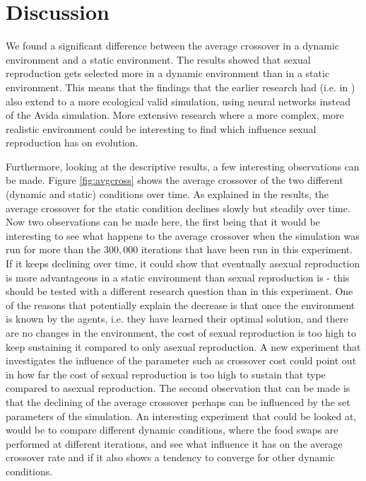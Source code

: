 \section{Discussion}

We found a significant difference between the average crossover in a dynamic environment and a static environment.
The results showed that sexual reproduction gets selected more in a dynamic environment than in a static environment.
This means that the findings that the earlier research had (i.e. in \cite{misevicchanging}) also extend to a more ecological valid simulation, using neural networks instead of the Avida simulation.
More extensive research where a more complex, more realistic environment could be interesting to find which influence sexual reproduction has on evolution.

Furthermore, looking at the descriptive results, a few interesting observations can be made.
Figure \ref{fig:avgcross} shows the average crossover of the two different (dynamic and static) conditions over time.
As explained in the results, the average crossover for the static condition declines slowly but steadily over time.
Now two observations can be made here, the first being that it would be interesting to see what happens to the average crossover when the simulation was run for more than the $300,000$ iterations that have been run in this experiment.
If it keeps declining over time, it could show that eventually asexual reproduction is more advantageous in a static environment than sexual reproduction is - this should be tested with a different research question than in this experiment.
One of the reasons that potentially explain the decrease is that once the environment is known by the agents, i.e. they have learned their optimal solution, and there are no changes in the environment, the cost of sexual reproduction is too high to keep sustaining it compared to only asexual reproduction.
A new experiment that investigates the influence of the parameter such as crossover cost could point out in how far the cost of sexual reproduction is too high to sustain that type compared to asexual reproduction.
The second observation that can be made is that the declining of the average crossover perhaps can be influenced by the set parameters of the simulation.
An interesting experiment that could be looked at, would be to compare different dynamic conditions, where the food swaps are performed at different iterations, and see what influence it has on the average crossover rate and if it also shows a tendency to converge for other dynamic conditions.

